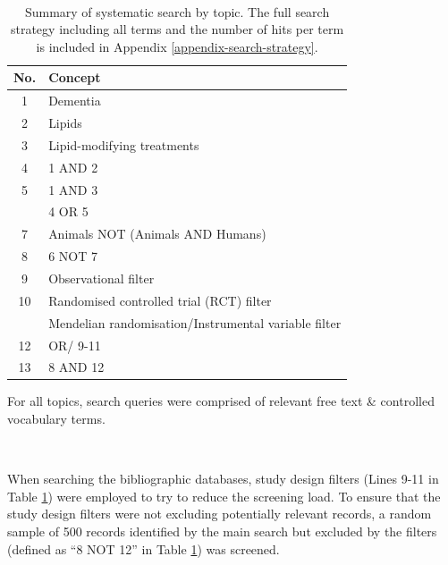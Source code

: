 \documentclass[a4paper, twoside]{templates/ociamthesis}
\begin{document}
~





\begin{table}[H]

\caption[searchOverview]{\label{tab:searchOverview-table}Summary of systematic search by topic. The full search strategy including all terms and the number of hits per term is included in Appendix \ref{appendix-search-strategy}.}
\centering
\fontsize{10}{12}\selectfont
\begin{threeparttable}
\begin{tabular}[t]{>{}cl}
\toprule
\textbf{No.} & \textbf{Concept}\\
\midrule
1 & Dementia\\
\midrule
2 & Lipids\\
\midrule
3 & Lipid-modifying treatments\\
\midrule
4 & 1 AND 2\\
\midrule
5 & 1 AND 3\\
\midrule
\addlinespace
6 & 4 OR 5\\
\midrule
7 & Animals NOT (Animals AND Humans)\\
\midrule
8 & 6 NOT 7\\
\midrule
9 & Observational filter\\
\midrule
10 & Randomised controlled trial (RCT) filter\\
\midrule
\addlinespace
11 & Mendelian randomisation/Instrumental variable filter\\
\midrule
12 & OR/ 9-11\\
\midrule
13 & 8 AND 12\\
\bottomrule
\end{tabular}
\begin{tablenotes}
\item For all topics, search queries were comprised of relevant free text \& controlled vocabulary terms.
\end{tablenotes}
\end{threeparttable}
\end{table}

~

When searching the bibliographic databases, study design filters (Lines 9-11 in Table \ref{tab:searchOverview-table}) were employed to try to reduce the screening load. To ensure that the study design filters were not excluding potentially relevant records, a random sample of 500 records identified by the main search but excluded by the filters (defined as ``8 NOT 12'' in Table \ref{tab:searchOverview-table}) was screened.
\end{document}
